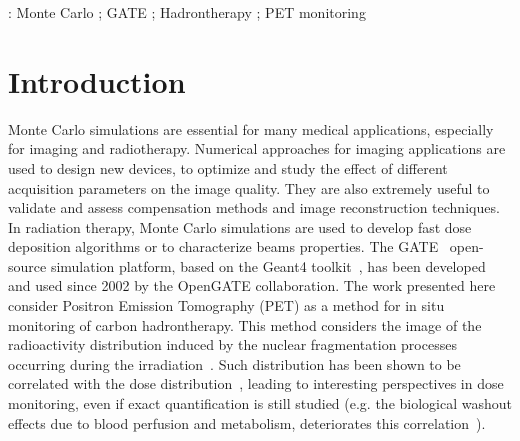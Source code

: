 \documentclass[11pt]{iopart}
\begin{document}
\vspace{2pc}
: Monte Carlo ; GATE ; Hadrontherapy ; PET monitoring
\maketitle


\section{Introduction}

Monte Carlo simulations are essential for many medical applications,
especially for imaging and radiotherapy. Numerical approaches for
imaging applications are used to design new devices, to optimize and
study the effect of different acquisition parameters on the image
quality. They are also extremely useful to validate and assess
compensation methods and image reconstruction techniques. In radiation
therapy, Monte Carlo simulations are used to develop fast dose
deposition algorithms or to characterize beams properties. The
GATE~\cite{Jan2004, Jan2011} open-source simulation platform, based on
the Geant4 toolkit~\cite{Allison2006, Agostinelli2003}, has been
developed and used since 2002 by the OpenGATE collaboration.  The work
presented here consider Positron Emission Tomography (PET) as a method
for in situ monitoring of carbon hadrontherapy. This method considers
the image of the radioactivity distribution induced by the nuclear
fragmentation processes occurring during the
irradiation~\cite{Enghardt1999}. Such distribution has been shown to
be correlated with the dose distribution~\cite{Moteabbed2011}, leading
to interesting perspectives in dose monitoring, even if exact
quantification is still studied (e.g. the biological washout effects
due to blood perfusion and metabolism, deteriorates this
correlation~\cite{Parodi2008}).
\end{document}
